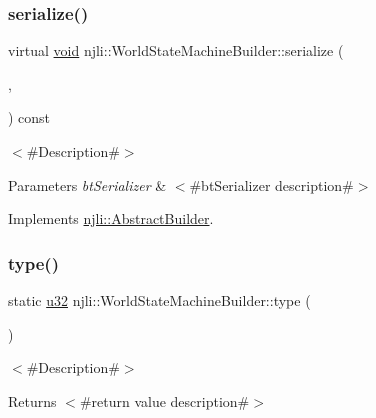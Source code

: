 \subsubsection{\texorpdfstring{serialize()}{serialize()}}
{\footnotesize\ttfamily virtual \mbox{\hyperlink{_thread_8h_af1e856da2e658414cb2456cb6f7ebc66}{void}} njli\+::\+World\+State\+Machine\+Builder\+::serialize (\begin{DoxyParamCaption}\item[{\mbox{\hyperlink{_thread_8h_af1e856da2e658414cb2456cb6f7ebc66}{void}} $\ast$}]{,  }\item[{bt\+Serializer $\ast$}]{ }\end{DoxyParamCaption}) const\hspace{0.3cm}{\ttfamily [virtual]}}

$<$\#\+Description\#$>$


\begin{DoxyParams}{Parameters}
{\em bt\+Serializer} & $<$\#bt\+Serializer description\#$>$ \\
\hline
\end{DoxyParams}


Implements \mbox{\hyperlink{classnjli_1_1_abstract_builder_ab66b774e02ccb9da554c9aab7fa6d981}{njli\+::\+Abstract\+Builder}}.

\mbox{\label{classnjli_1_1_world_state_machine_builder_a0306d9106c572c98b3adca2850d6e528}} 
\subsubsection{\texorpdfstring{type()}{type()}}
{\footnotesize\ttfamily static \mbox{\hyperlink{_util_8h_a10e94b422ef0c20dcdec20d31a1f5049}{u32}} njli\+::\+World\+State\+Machine\+Builder\+::type (\begin{DoxyParamCaption}{ }\end{DoxyParamCaption})\hspace{0.3cm}{\ttfamily [static]}}

$<$\#\+Description\#$>$

\begin{DoxyReturn}{Returns}
$<$\#return value description\#$>$ 
\end{DoxyReturn}


